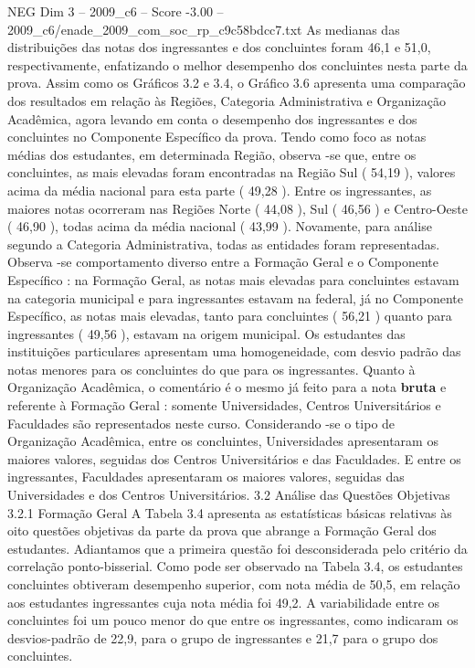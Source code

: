 \begin{textsample}{NEG Dim 3 – 2009\_c6 – Score -3.00 – 2009\_c6/enade\_2009\_com\_soc\_rp\_c9c58bdcc7.txt}
As medianas das distribuições das notas dos ingressantes e dos concluintes foram 46,1 e 51,0, respectivamente, enfatizando o melhor desempenho dos concluintes nesta parte da prova.
Assim como os Gráficos 3.2 e 3.4, o Gráfico 3.6 apresenta uma comparação dos resultados em relação às Regiões, Categoria Administrativa e Organização Acadêmica, agora levando em conta o desempenho dos ingressantes e dos concluintes no Componente Específico da prova.
Tendo como foco as notas médias dos estudantes, em determinada Região, observa -se que, entre os concluintes, as mais elevadas foram encontradas na Região Sul ( 54,19 ), valores acima da média nacional para esta parte ( 49,28 ).
Entre os ingressantes, as maiores notas ocorreram nas Regiões Norte ( 44,08 ), Sul ( 46,56 ) e Centro-Oeste ( 46,90 ), todas acima da média nacional ( 43,99 ).
Novamente, para análise segundo a Categoria Administrativa, todas as entidades foram representadas.
Observa -se comportamento diverso entre a Formação Geral e o Componente Específico : na Formação Geral, as notas mais elevadas para concluintes estavam na categoria municipal e para ingressantes estavam na federal, já no Componente Específico, as notas mais elevadas, tanto para concluintes ( 56,21 ) quanto para ingressantes ( 49,56 ), estavam na origem municipal.
Os estudantes das instituições particulares apresentam uma homogeneidade, com desvio padrão das notas menores para os concluintes do que para os ingressantes.
Quanto à Organização Acadêmica, o comentário é o mesmo já feito para a nota \textbf{bruta} e referente à Formação Geral : somente Universidades, Centros Universitários e Faculdades são representados neste curso.
Considerando -se o tipo de Organização Acadêmica, entre os concluintes, Universidades apresentaram os maiores valores, seguidas dos Centros Universitários e das Faculdades.
E entre os ingressantes, Faculdades apresentaram os maiores valores, seguidas das Universidades e dos Centros Universitários. 3.2 Análise das Questões Objetivas 3.2.1 Formação Geral A Tabela 3.4 apresenta as estatísticas básicas relativas às oito questões objetivas da parte da prova que abrange a Formação Geral dos estudantes.
Adiantamos que a primeira questão foi desconsiderada pelo critério da correlação ponto-bisserial.
Como pode ser observado na Tabela 3.4, os estudantes concluintes obtiveram desempenho superior, com nota média de 50,5, em relação aos estudantes ingressantes cuja nota média foi 49,2.
A variabilidade entre os concluintes foi um pouco menor do que entre os ingressantes, como indicaram os desvios-padrão de 22,9, para o grupo de ingressantes e 21,7 para o grupo dos concluintes.

\end{textsample}
